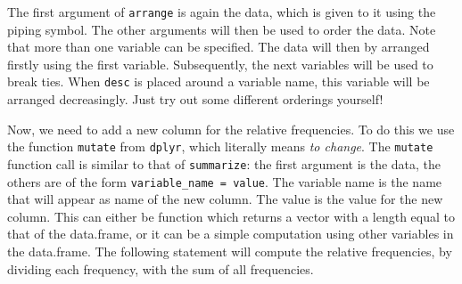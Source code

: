 \documentclass[]{tufte-book}
\newenvironment{Shaded}{}{}
\newcommand{\DataTypeTok}[1]{\textcolor[rgb]{0.56,0.13,0.00}{#1}}
\newcommand{\KeywordTok}[1]{\textcolor[rgb]{0.00,0.44,0.13}{\textbf{#1}}}
\newcommand{\NormalTok}[1]{#1}
\newcommand{\OperatorTok}[1]{\textcolor[rgb]{0.40,0.40,0.40}{#1}}
\newcommand{\StringTok}[1]{\textcolor[rgb]{0.25,0.44,0.63}{#1}}
\begin{document}
The first argument of \texttt{arrange} is again the data, which is given to it using the piping symbol. The other arguments will then be used to order the data. Note that more than one variable can be specified. The data will then by arranged firstly using the first variable. Subsequently, the next variables will be used to break ties. When \texttt{desc} is placed around a variable name, this variable will be arranged decreasingly. Just try out some different orderings yourself!

Now, we need to add a new column for the relative frequencies. To do this we use the function \texttt{mutate} from \texttt{dplyr}, which literally means \emph{to change}. The \texttt{mutate} function call is similar to that of \texttt{summarize}: the first argument is the data, the others are of the form \texttt{variable\_name\ =\ value}. The variable name is the name that will appear as name of the new column. The value is the value for the new column. This can either be function which returns a vector with a length equal to that of the data.frame, or it can be a simple computation using other variables in the data.frame. The following statement will compute the relative frequencies, by dividing each frequency, with the sum of all frequencies.

\begin{Shaded}
\end{Shaded}
\end{document}
